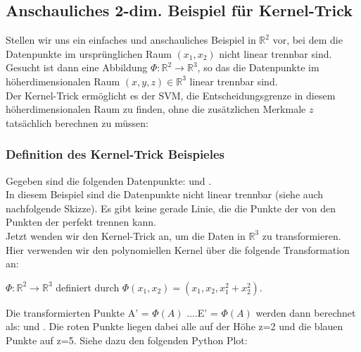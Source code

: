 \documentclass[12pt]{article}
\begin{document}
\subsection{Anschauliches 2-dim. Beispiel für Kernel-Trick}

Stellen wir uns ein einfaches und anschauliches Beispiel in $\mathbb{R}^2$ vor, bei dem die Datenpunkte im ursprünglichen Raum $(x_1,x_2)$ nicht linear trennbar sind.\\ 
Gesucht ist dann eine Abbildung $\Phi:\mathbb{R}^2 \rightarrow\mathbb{R}^3$, so das die Datenpunkte im höherdimensionalen Raum $(x,y,z)\in  \mathbb{R}^3$ linear trennbar sind.\\ 
Der Kernel-Trick ermöglicht es der SVM, die Entscheidungsgrenze in diesem höherdimensionalen Raum zu finden, ohne die zusätzlichen Merkmale $z$ tatsächlich berechnen zu müssen:\\ 
\subsubsection{Definition des Kernel-Trick Beispieles}
Gegeben sind die folgenden Datenpunkte: {\color{red}{Klasse +1: A(1,1), B(-1,1)}} und {\color{blue}{Klasse -1: C(2,1), D(1,-2) und E(-2,1)}}.\\
In diesem Beispiel sind die Datenpunkte nicht linear trennbar (siehe auch nachfolgende Skizze). Es gibt keine gerade Linie, die die Punkte der {\color{red}{Klasse +1}} von den Punkten der {\color{blue}{Klasse -1}} perfekt trennen kann.\\
Jetzt wenden wir den Kernel-Trick an, um die Daten in $\mathbb{R}^3$ zu transformieren. Hier verwenden wir den polynomiellen Kernel über die folgende Transformation an: 
\begin{center}
 $\Phi:\mathbb{R}^2 \rightarrow\mathbb{R}^3$ definiert durch  $\Phi(x_1,x_2) = (x_1,x_2, x_1^2 + x_2^2)$. 
\end{center} 
Die transformierten Punkte A' = $\Phi(A)$ ....E' = $\Phi(A)$ werden dann berechnet als: {\color{red}{Klasse +1: A'(1,1,2), B'(-1,1,2)}} und {\color{blue}{Klasse -1: C'(2,1,5), D'(1,-2,5) und E'(-2,1,5)}}. Die roten Punkte liegen dabei alle auf der Höhe z=2 und die blauen Punkte auf z=5. Siehe dazu den folgenden Python Plot:\\[0.2cm]

\newpage
\end{document}
